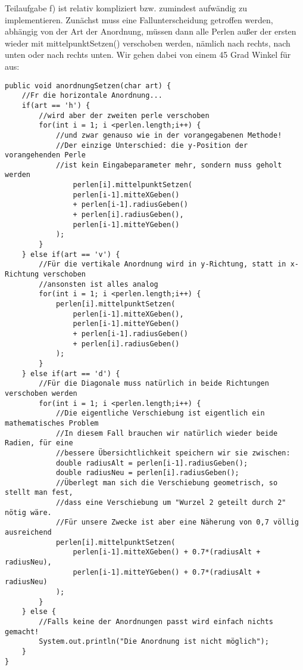 \documentclass{article}
\begin{document}
Teilaufgabe f) ist relativ kompliziert bzw. zumindest aufwändig zu implementieren. Zunächst muss eine Fallunterscheidung getroffen werden, abhängig von der Art der Anordnung, müssen dann alle Perlen außer der ersten wieder mit mittelpunktSetzen() verschoben werden, nämlich nach rechts, nach unten oder nach  rechts unten. Wir gehen dabei von einem 45 Grad Winkel für  aus:
\begin{verbatim}
public void anordnungSetzen(char art) {
    //Fr die horizontale Anordnung...
    if(art == 'h') {
        //wird aber der zweiten perle verschoben
        for(int i = 1; i <perlen.length;i++) {
            //und zwar genauso wie in der vorangegabenen Methode!
            //Der einzige Unterschied: die y-Position der vorangehenden Perle
            //ist kein Eingabeparameter mehr, sondern muss geholt werden
                perlen[i].mittelpunktSetzen(
                perlen[i-1].mitteXGeben() 
                + perlen[i-1].radiusGeben() 
                + perlen[i].radiusGeben(),
                perlen[i-1].mitteYGeben()
            );
        }
    } else if(art == 'v') {
        //Für die vertikale Anordnung wird in y-Richtung, statt in x-Richtung verschoben
        //ansonsten ist alles analog
        for(int i = 1; i <perlen.length;i++) {
            perlen[i].mittelpunktSetzen(
                perlen[i-1].mitteXGeben(),
                perlen[i-1].mitteYGeben() 
                + perlen[i-1].radiusGeben()
                + perlen[i].radiusGeben()
            );
        }
    } else if(art == 'd') {
        //Für die Diagonale muss natürlich in beide Richtungen verschoben werden
        for(int i = 1; i <perlen.length;i++) {
            //Die eigentliche Verschiebung ist eigentlich ein mathematisches Problem
            //In diesem Fall brauchen wir natürlich wieder beide Radien, für eine
            //bessere Übersichtlichkeit speichern wir sie zwischen:
            double radiusAlt = perlen[i-1].radiusGeben();
            double radiusNeu = perlen[i].radiusGeben();
            //Überlegt man sich die Verschiebung geometrisch, so stellt man fest, 
            //dass eine Verschiebung um "Wurzel 2 geteilt durch 2" nötig wäre.
            //Für unsere Zwecke ist aber eine Näherung von 0,7 völlig ausreichend
            perlen[i].mittelpunktSetzen(
                perlen[i-1].mitteXGeben() + 0.7*(radiusAlt + radiusNeu),
                perlen[i-1].mitteYGeben() + 0.7*(radiusAlt + radiusNeu)
            );
        }
    } else {
        //Falls keine der Anordnungen passt wird einfach nichts gemacht!
        System.out.println("Die Anordnung ist nicht möglich");
    }
}
\end{verbatim}
\end{document}
